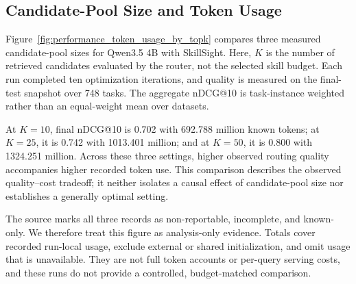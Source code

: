 \subsection{Candidate-Pool Size and Token Usage}
\label{app:candidate-pool-tokens}
Figure~\ref{fig:performance_token_usage_by_topk} compares three measured candidate-pool sizes for Qwen3.5 4B with SkillSight. Here, $K$ is the number of retrieved candidates evaluated by the router, not the selected skill budget. Each run completed ten optimization iterations, and quality is measured on the final-test snapshot over 748 tasks. The aggregate nDCG@10 is task-instance weighted rather than an equal-weight mean over datasets.

At $K=10$, final nDCG@10 is 0.702 with 692.788 million known tokens; at $K=25$, it is 0.742 with 1013.401 million; and at $K=50$, it is 0.800 with 1324.251 million. Across these three settings, higher observed routing quality accompanies higher recorded token use. This comparison describes the observed quality--cost tradeoff; it neither isolates a causal effect of candidate-pool size nor establishes a generally optimal setting.

The source marks all three records as non-reportable, incomplete, and known-only. We therefore treat this figure as analysis-only evidence. Totals cover recorded run-local usage, exclude external or shared initialization, and omit usage that is unavailable. They are not full token accounts or per-query serving costs, and these runs do not provide a controlled, budget-matched comparison.


